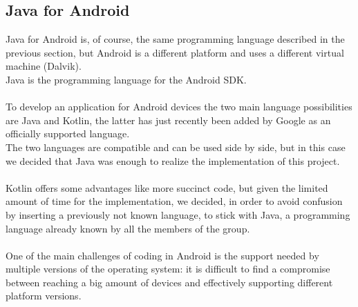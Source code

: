 \subsection{Java for Android}
\label{subsect:Java for Android}
Java for Android is, of course, the same programming language described in the previous section, but Android is a different platform and uses a different virtual machine (Dalvik). \\
Java is the programming language for the Android SDK. \\\\
To develop an application for Android devices the two main language possibilities are Java and Kotlin, the latter has just recently been added by Google as an officially supported language.\\
The two languages are compatible and can be used side by side, but in this case we decided that Java was enough to realize the implementation of this project.\\\\
Kotlin offers some advantages like more succinct code, but given the limited amount of time for the implementation, we decided, in order to avoid confusion by inserting a previously not known language, to stick with Java, a programming language already known by all the members of the group. \\\\
One of the main challenges of coding in Android is the support needed by multiple versions of the operating system: it is difficult to find a compromise between reaching a big amount of devices and effectively supporting different platform versions.

